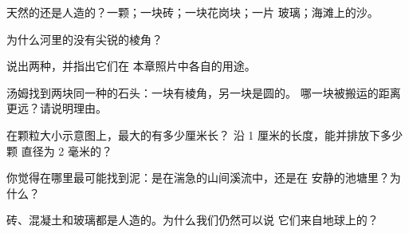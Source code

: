 \begin{exercise}[$\star$]\label{exo:g3:stones-pebbles-sand:4}
天然的还是人造的？一颗；一块砖；一块花岗块；一片
玻璃；海滩上的沙。
\end{exercise}

\begin{exercise}[$\star$]\label{exo:g3:stones-pebbles-sand:5}
为什么河里的没有尖锐的棱角？
\end{exercise}

\begin{exercise}[$\star$]\label{exo:g3:stones-pebbles-sand:6}
说出两种，并指出它们在
本章照片中各自的用途。
\end{exercise}

\begin{exercise}[$\star\star$]\label{exo:g3:stones-pebbles-sand:7}
汤姆找到两块同一种的石头：一块有棱角，另一块是圆的。
哪一块被搬运的距离更远？请说明理由。
\end{exercise}

\begin{exercise}[$\star\star$]\label{exo:g3:stones-pebbles-sand:8}
在颗粒大小示意图上，最大的有多少厘米长？
沿 1 厘米的长度，能并排放下多少颗
直径为 2 毫米的？
\end{exercise}

\begin{exercise}[$\star\star$]\label{exo:g3:stones-pebbles-sand:9}
你觉得在哪里最可能找到泥：是在湍急的山间溪流中，还是在
安静的池塘里？为什么？
\end{exercise}

\begin{exercise}[$\star\star$]\label{exo:g3:stones-pebbles-sand:10}
砖、混凝土和玻璃都是人造的。为什么我们仍然可以说
它们来自地球上的？
\end{exercise}
